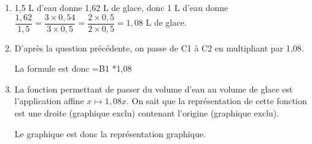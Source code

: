 
\medskip

\begin{enumerate}
\item 1,5 L d'eau donne 1,62 L de glace, donc 1 L d'eau donne $\dfrac{1,62}{1,5} = \dfrac{3 \times 0,54}{3 \times 0,5} = \dfrac{2 \times 0,5}{2 \times 0,5} = 1,08$ L de glace.
\item D'après la question précédente, on passe de C1 à C2 en multipliant par 1,08.

La formule est donc =B1 *1,08
\item La fonction permettant de passer du volume d'eau au volume de glace est l'application affine $x \longmapsto 1,08x$. On sait que la représentation de cette fonction est une droite (graphique  exclu) contenant l'origine (graphique  exclu).

Le graphique  est donc la représentation graphique.
\end{enumerate}
